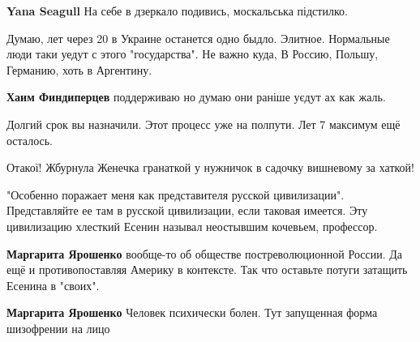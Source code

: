 \begin{itemize}
\begin{itemize}
\textbf{Yana Seagull} На себе в дзеркало подивись, москальська підстилко.
\end{itemize}



Думаю, лет через 20 в Украине останется одно быдло. Элитное. Нормальные люди
таки уедут с этого "государства". Не важно куда, В Россию, Польшу, Германию,
хоть в Аргентину.

\begin{itemize}

\textbf{Хаим Финдиперцев} поддерживаю но думаю они раніше уєдут ах как жаль.


Долгий срок вы назначили. Этот процесс уже на полпути. Лет 7 максимум ещё осталось.

\end{itemize}


Отакої!
Жбурнула Женечка гранаткой у нужничок в садочку вишневому за хаткой!



"Особенно поражает меня как представителя русской цивилизации". Представляйте
ее там в русской цивилизации, если таковая имеется. Эту цивилизацию хлесткий
Есенин называл неостывшим кочевьем, профессор.

\begin{itemize}

\textbf{Маргарита Ярошенко} вообще-то об обществе постреволюционной России. Да ещё и противопоставляя Америку в контексте. Так что оставьте потуги затащить Есенина в "своих".


\textbf{Маргарита Ярошенко} Человек психически болен. Тут запущенная форма шизофрении на лицо


\end{itemize}
\end{itemize}
